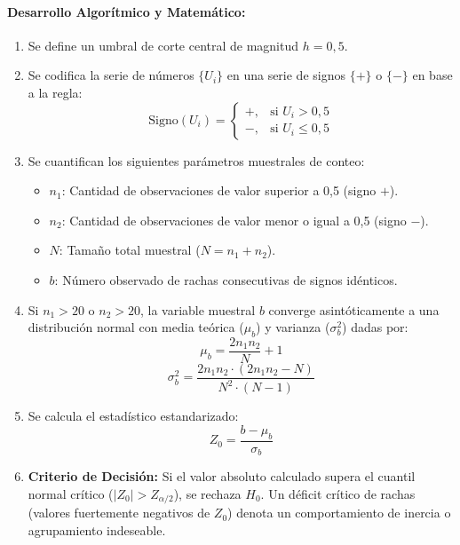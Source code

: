 \documentclass{article}
\begin{document}
\paragraph{Desarrollo Algorítmico y Matemático:}
\begin{enumerate}
    \item Se define un umbral de corte central de magnitud $h = 0,5$.
    \item Se codifica la serie de números $\{U_i\}$ en una serie de signos $\{+\}$ o $\{-\}$ en base a la regla:
    \begin{equation}
        \text{Signo}(U_i) = \begin{cases} +, & \text{si } U_i > 0,5 \\ -, & \text{si } U_i \le 0,5 \end{cases}
    \end{equation}
    \item Se cuantifican los siguientes parámetros muestrales de conteo:
    \begin{itemize}
        \item $n_1$: Cantidad de observaciones de valor superior a 0,5 (signo $+$).
        \item $n_2$: Cantidad de observaciones de valor menor o igual a 0,5 (signo $-$).
        \item $N$: Tamaño total muestral ($N = n_1 + n_2$).
        \item $b$: Número observado de rachas consecutivas de signos idénticos.
    \end{itemize}
    \item Si $n_1 > 20$ o $n_2 > 20$, la variable muestral $b$ converge asintóticamente a una distribución normal con media teórica ($\mu_b$) y varianza ($\sigma_b^2$) dadas por:
    \begin{equation}
        \mu_b = \frac{2n_1 n_2}{N} + 1
    \end{equation}
    \begin{equation}
        \sigma_b^2 = \frac{2n_1 n_2 \cdot (2n_1 n_2 - N)}{N^2 \cdot (N - 1)}
    \end{equation}
    \item Se calcula el estadístico estandarizado:
    \begin{equation}
        Z_0 = \frac{b - \mu_b}{\sigma_b}
    \end{equation}
    \item \textbf{Criterio de Decisión:} Si el valor absoluto calculado supera el cuantil normal crítico ($|Z_0| > Z_{\alpha/2}$), se rechaza $H_0$. Un déficit crítico de rachas (valores fuertemente negativos de $Z_0$) denota un comportamiento de inercia o agrupamiento indeseable.
\end{enumerate}
\end{document}
